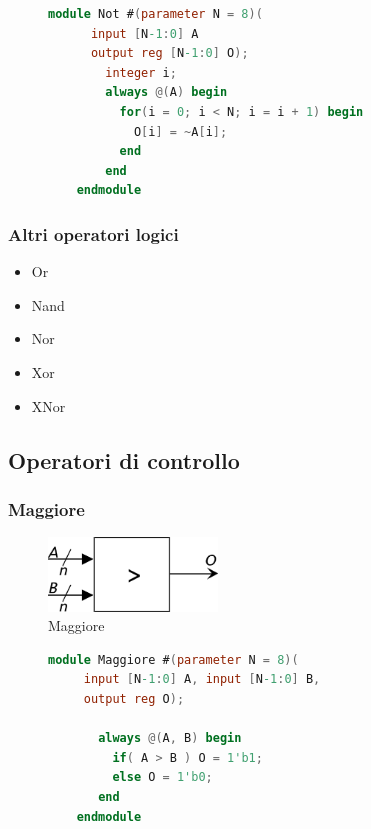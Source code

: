 \documentclass[a4paper]{article}
\theoremstyle{break}
\theoremstyle{break}
\theoremstyle{break}
\theoremstyle{break}
\begin{document}
\begin{figure}[H]
  \begin{lstlisting}[language=Verilog]
    module Not #(parameter N = 8)(
      input [N-1:0] A
      output reg [N-1:0] O);
        integer i;
        always @(A) begin
          for(i = 0; i < N; i = i + 1) begin
            O[i] = ~A[i];
          end
        end
    endmodule
  \end{lstlisting}
\end{figure}

\subsubsection{Altri operatori logici}
\begin{itemize}
  \item Or
  \item Nand
  \item Nor
  \item Xor
  \item XNor
\end{itemize}

\subsection{Operatori di controllo}
\subsubsection{Maggiore}
\begin{figure}[H]
  \begin{center}
    \includegraphics[width=0.40\textwidth]{figures/greater}
  \end{center}
  \caption{Maggiore}
\end{figure}

\begin{figure}[H]
  \begin{lstlisting}[language=Verilog]
    module Maggiore #(parameter N = 8)(
     input [N-1:0] A, input [N-1:0] B,
     output reg O);

       always @(A, B) begin
         if( A > B ) O = 1'b1;
         else O = 1'b0;
       end
    endmodule
  \end{lstlisting}
\end{figure}
\end{document}
